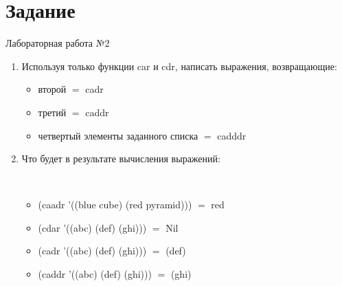 \newpage
\section*{Задание}
\Large{Лабораторная работа №2}

\begin{enumerate}
	\item Используя только функции car и cdr, написать выражения, возвращающие:
	\begin{itemize}
		\item второй $=$ cadr
		\item третий $=$ caddr
		\item четвертый элементы заданного списка $=$ cadddr
	\end{itemize}
	\item Что будет в результате вычисления выражений:\\
	\begin{minipage}[t]{1.1\textwidth}
		\centering{}
		\label{fig1}
	\end{minipage}\hfill
	\\
	\begin{minipage}[t]{1.1\textwidth}
		\centering{}
		\label{fig2}
	\end{minipage}\hfill
	\begin{itemize}
		\item (caadr '((blue cube) (red pyramid))) $=$ red
		\item (cdar '((abc) (def) (ghi))) $=$ Nil
		\item (cadr '((abc) (def) (ghi))) $=$ (def)
		\item (caddr '((abc) (def) (ghi))) $=$ (ghi)
	\end{itemize}
\end{enumerate}